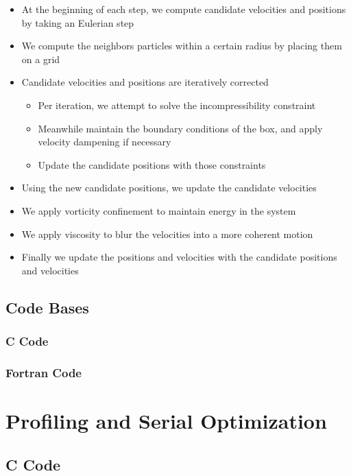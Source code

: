 \documentclass{scrartcl}
\begin{document}
    \begin{itemize}
        \item At the beginning of each step, we compute candidate velocities and positions by taking an Eulerian step
        \item We compute the neighbors particles within a certain radius by placing them on a grid
        \item Candidate velocities and positions are iteratively corrected
        \begin{itemize}
            \item Per iteration, we attempt to solve the incompressibility constraint
            \item Meanwhile maintain the boundary conditions of the box, and apply velocity dampening if necessary
            \item Update the candidate positions with those constraints
        \end{itemize}
        \item Using the new candidate positions, we update the candidate velocities
        \item We apply vorticity confinement to maintain energy in the system
        \item We apply viscosity to blur the velocities into a more coherent motion
        \item Finally we update the positions and velocities with the candidate positions and velocities
    \end{itemize}
    
    \subsection{Code Bases}
    \subsubsection{C Code}

    \subsubsection{Fortran Code}
    
    
    \section{Profiling and Serial Optimization}
    
    \subsection{C Code}
\end{document}
